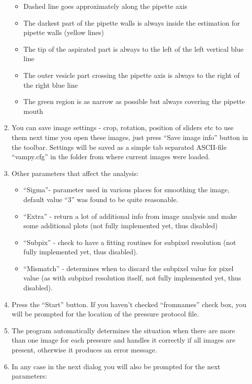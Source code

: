 \begin{enumerate}
\begin{itemize}
		\item Dashed line goes approximately along the pipette axis
		\item The darkest part of the pipette walls is always inside the estimation for pipette walls (yellow lines)
		\item The tip of the aspirated part is always to the left of the left vertical blue line
		\item The outer vesicle part crossing the pipette axis is always to the right of the right blue line
		\item The green region is as narrow as possible but always covering the pipette mouth
	\end{itemize} 
	\item You can save image settings - crop, rotation, position of sliders etc to use them next time you open these images, just press ``Save image info'' button in the toolbar. Settings will be saved as a simple tab separated ASCII-file ``vampy.cfg'' in the folder from where current images were loaded.
	\item Other parameters that affect the analysis:
	\begin{itemize}
		\item ``Sigma''- parameter used in various places for smoothing the image, default value ``3'' was found to be quite reasonable.
		\item ``Extra'' - return a lot of additional info from image analysis and make some additional plots (not fully implemented yet, thus disabled)
		\item ``Subpix'' - check to have a fitting routines for subpixel resolution (not fully implemented yet, thus disabled).
		\item ``Mismatch'' - determines when to discard the subpixel value for pixel value (as with subpixel resolution itself, not fully implemented yet, thus disabled).
	\end{itemize}
	\item Press the ``Start'' button. If you haven't checked ``fromnames'' check box, you will be prompted for the location of the pressure protocol file.
	\item The program automatically determines the situation when there are more than one image for each pressure and handles it correctly if all images are present, otherwise it produces an error message.
	\item In any case in the next dialog you will also be prompted for the next parameters:
	\begin{itemize}

\end{itemize}
\end{enumerate}
